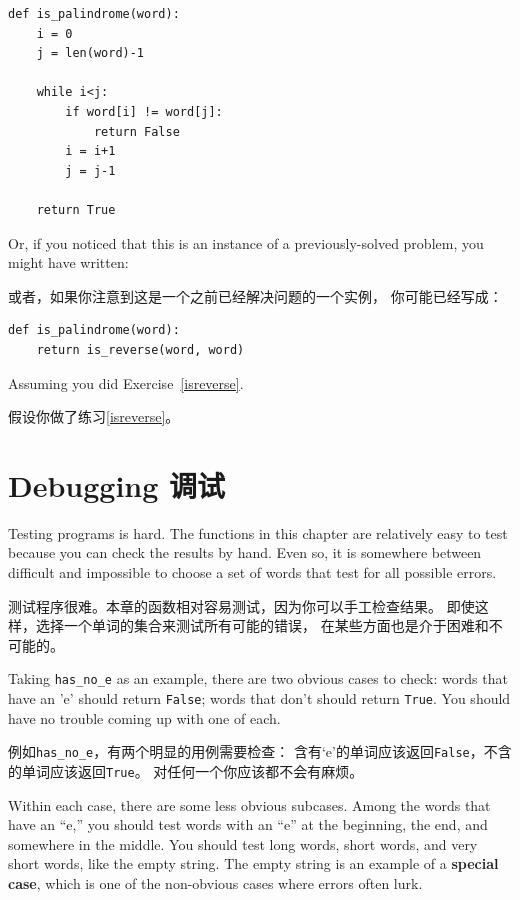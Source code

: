 \documentclass[10pt]{book}
\begin{document}
\begin{CJK}{UTF8}{gbsn}
\begin{verbatim}
def is_palindrome(word):
    i = 0
    j = len(word)-1

    while i<j:
        if word[i] != word[j]:
            return False
        i = i+1
        j = j-1

    return True
\end{verbatim}

Or, if you noticed that this is an instance of a previously-solved
problem, you might have written:

或者，如果你注意到这是一个之前已经解决问题的一个实例，
你可能已经写成：

\begin{verbatim}
def is_palindrome(word):
    return is_reverse(word, word)
\end{verbatim}

Assuming you did Exercise~\ref{isreverse}.

假设你做了练习\ref{isreverse}。


\section{Debugging 调试}

Testing programs is hard.  The functions in this chapter are
relatively easy to test because you can check the results by hand.
Even so, it is somewhere between difficult and impossible to choose a
set of words that test for all possible errors.

测试程序很难。本章的函数相对容易测试，因为你可以手工检查结果。
即使这样，选择一个单词的集合来测试所有可能的错误，
在某些方面也是介于困难和不可能的。

Taking \verb"has_no_e" as an example, there are two obvious
cases to check: words that have an 'e' should return {\tt False};
words that don't should return {\tt True}.  You should have no
trouble coming up with one of each.

例如\verb"has_no_e"，有两个明显的用例需要检查：
含有`e'的单词应该返回{\tt False}，不含的单词应该返回{\tt True}。
对任何一个你应该都不会有麻烦。

Within each case, there are some less obvious subcases.  Among the
words that have an ``e,'' you should test words with an ``e'' at the
beginning, the end, and somewhere in the middle.  You should test long
words, short words, and very short words, like the empty string.  The
empty string is an example of a {\bf special case}, which is one of
the non-obvious cases where errors often lurk.


\end{CJK}
\end{document}
